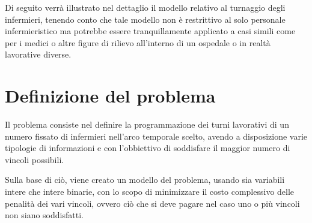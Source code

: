 Di seguito verrà illustrato nel dettaglio il modello relativo al turnaggio degli infermieri, tenendo conto che tale modello non è restrittivo al solo personale infermieristico ma potrebbe essere tranquillamente applicato a casi simili come per i medici o altre figure di rilievo all'interno di un ospedale o in realtà lavorative diverse.

\section{Definizione del problema}
Il problema consiste nel definire la programmazione dei turni lavorativi di un numero fissato di infermieri nell'arco temporale scelto, avendo a disposizione varie tipologie di informazioni e con l'obbiettivo di soddisfare il maggior numero di vincoli possibili.

Sulla base di ciò, viene creato un modello del problema, usando sia variabili intere che intere binarie, con lo scopo di minimizzare il costo complessivo delle penalità dei vari vincoli, ovvero ciò che si deve pagare nel caso uno o più vincoli non siano soddisfatti.

